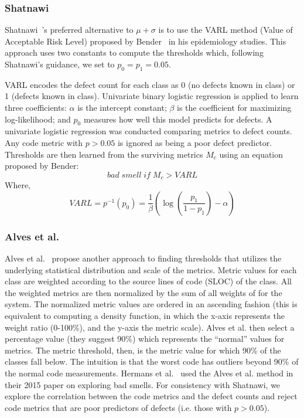 \documentclass[twocolumn,5p]{elsarticle}
\theoremstyle{break}
\begin{document}
	\subsubsection{ Shatnawi}
	Shatnawi~\cite{Shatnawi10}'s preferred alternative to $\mu+\sigma$
	is to use the VARL method (Value of Acceptable Risk Level) proposed by Bender~\cite{bender99} in his epidemiology studies.  This approach uses two
	constants to compute the thresholds which, following Shatnawi's guidance, we set to
	$p_0=p_1=0.05$.
	
	VARL encodes the defect count
	for each class as 0 (no defects known in class) or 1 (defects known in class).
	Univariate binary logistic regression is applied to learn three coefficients:  
	$\alpha$ is the intercept constant;
	$\beta$ is the coefficient for maximizing log-likelihood;
	and $p_0$ 
	measures   how well this  model predicts for  defects. A univariate logistic regression was conducted comparing metrics to defect counts. Any code metric with $p>0.05$ is ignored as being a poor defect predictor. Thresholds are then learned from the surviving metrics $M_c$ using
	an equation proposed by Bender:
	$$ \mathit{bad\; smell\; if\;} M_c > VARL$$
	Where,
	\begin{equation}
		VARL = p^{-1}(p_0) =  \frac{1}{\beta }\left( {\log \left( {\frac{{{p_1}}}{{1 - {p_1}}}} \right) - \alpha } \right) 
	\end{equation}
	
	
	\subsubsection{ Alves et al.}
	Alves et al.~\cite{Alves2010} propose another approach 
	to finding thresholds that  utilizes the underlying statistical distribution and scale of the metrics. 
	Metric values for each class are weighted according to the source lines of code (SLOC) of the class. All the weighted metrics are then normalized by the sum of all weights of for the system. 
	The normalized metric values are ordered in an ascending fashion (this is equivalent to computing a density function, in which the x-axis represents the weight ratio (0-100\%), and the y-axis the metric scale).
	Alves et al. then select a percentage value (they suggest 90\%) which represents the ``normal'' values for metrics. The metric threshold, then, is the metric value for which 90\% of the classes fall below. The intuition  is that the worst code has outliers beyond 90\% of the normal code measurements. Hermans et al.~\cite{hermans15} used the
	Alves et al. method in their  2015 paper on
	exploring bad smells. For consistency with Shatnawi, we explore the correlation between the code metrics and the defect counts and  reject code metrics that are poor predictors of defects (i.e.   those  with $p > 0.05$).
	
\end{document}
